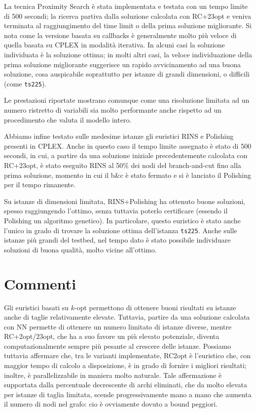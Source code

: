 La tecnica Proximity Search è stata implementata e testata con un tempo limite di 500 secondi; la ricerca partiva dalla soluzione calcolata con RC+23opt e veniva terminata al raggiungimento del time limit o della prima soluzione migliorante. Si nota come la versione basata su callbacks è generalmente molto più veloce di quella basata su CPLEX in modalità iterativa. In alcuni casi la soluzione individuata è la soluzione ottima; in molti altri casi, la veloce individuazione della prima soluzione migliorante suggerisce un rapido avvicinamento ad una buona soluzione, cosa auspicabile soprattutto per istanze di grandi dimensioni, o difficili (come \texttt{ts225}).

Le prestazioni riportate mostrano comunque come una risoluzione limitata ad un numero ristretto di variabili sia molto performante anche rispetto ad un procedimento che valuta il modello intero. 

Abbiamo infine testato sulle medesime istanze gli euristici RINS e Polishing presenti in CPLEX. Anche in questo caso il tempo limite assegnato è stato di 500 secondi, in cui, a partire da una soluzione iniziale precedentemente calcolata con RC+23opt, è stato eseguito RINS al 50\% dei nodi del branch-and-cut fino alla prima soluzione, momento in cui il b\&c è stato fermato e si è lanciato il Polishing per il tempo rimanente.

Su istanze di dimensioni limitata, RINS+Polishing ha ottenuto buone soluzioni, spesso raggiungendo l’ottimo, senza tuttavia poterlo certificare (essendo il Polishing un algoritmo genetico). In particolare, questo euristico è stato anche l’unico in grado di trovare la soluzione ottima dell’istanza \texttt{ts225}. Anche sulle istanze più grandi del testbed, nel tempo dato è stato possibile individuare soluzioni di buona qualità, molto vicine all’ottimo.

\section{Commenti}
Gli euristici basati su $k$-opt permettono di ottenere buoni risultati su istanze anche di taglie relativamente elevate. Tuttavia, partire da una soluzione calcolata con NN permette di ottenere un numero limitato di istanze diverse, mentre RC+2opt/23opt, che ha a suo favore un più elevato potenziale, diventa computazionalmente sempre più pesante al crescere delle istanze. Possiamo tuttavia affermare che, tra le varianti implementate, RC2opt è l’euristico che, con maggior tempo di calcolo a disposizione, è in grado di fornire i migliori risultati; inoltre, è parallelizzabile in maniera molto naturale. Tale affermazione è supportata dalla percentuale decrescente di archi eliminati, che da molto elevata per istanze di taglia limitata, scende progressivamente mano a mano che aumenta il numero di nodi nel grafo: cio è ovviamente dovuto a bound peggiori.

